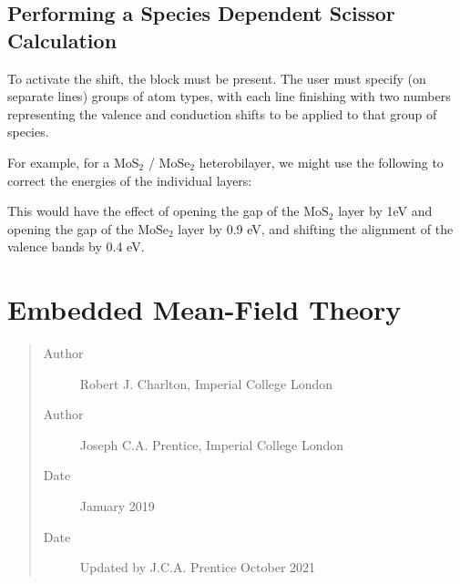 \documentclass[letterpaper,10pt,english]{sphinxmanual}
\begin{document}
\subsection{Performing a Species Dependent Scissor Calculation}
\label{\detokenize{scissor_operator:performing-a-species-dependent-scissor-calculation}}
To activate the shift, the  block must be present.
The user must specify (on separate lines) groups of atom types, with
each line finishing with two numbers representing the valence and
conduction shifts to be applied to that group of species.

For example, for a \(\textrm{MoS}_2\) / \(\textrm{MoSe}_2\)
heterobilayer, we might use the following to correct the energies of the
individual layers:

%
\begin{sphinxVerbatim}[commandchars=\\\{\}]
 
    
   
 
\end{sphinxVerbatim}

This would have the effect of opening the gap of the
\(\textrm{MoS}_2\) layer by 1eV and opening the gap of the
\(\textrm{MoSe}_2\) layer by 0.9 eV, and shifting the alignment of
the valence bands by 0.4 eV.


\section{Embedded Mean-Field Theory}
\label{\detokenize{EMFT_in_ONETEP:embedded-mean-field-theory}}\label{\detokenize{EMFT_in_ONETEP::doc}}\begin{quote}\begin{description}
\item[{Author}] \leavevmode
Robert J. Charlton, Imperial College London

\item[{Author}] \leavevmode
Joseph C.A. Prentice, Imperial College London

\item[{Date}] \leavevmode
January 2019

\item[{Date}] \leavevmode
Updated by J.C.A. Prentice October 2021

\end{description}\end{quote}
\end{document}
